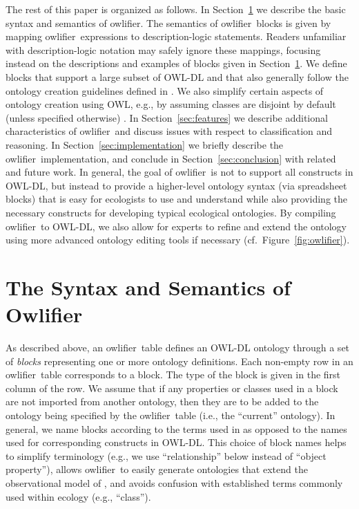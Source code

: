 \documentclass[5p,authoryear]{elsarticle}
\newcommand{\Owlifier}{\textsf{Owlifier}}
\newcommand{\owlifier}{\textsf{owlifier}}
\newcommand{\secref}[1]{Section~\ref{#1}}
\newcommand{\figref}[1]{Figure~\ref{#1}}
\begin{document}
The rest of this paper is organized as follows. In
\secref{sec:owlifier} we describe the basic syntax and semantics of
\owlifier. The semantics of \owlifier\ blocks is given by mapping
\owlifier\ expressions to description-logic statements. Readers
unfamiliar with description-logic notation may safely ignore these
mappings, focusing instead on the descriptions and examples of blocks
given in \secref{sec:owlifier}.  We define blocks that support a large
subset of OWL-DL and that also generally follow the ontology creation
guidelines defined in \citep{rector04:_owl_pizzas}. We also simplify
certain aspects of ontology creation using OWL, e.g., by assuming
classes are disjoint by default (unless specified otherwise)
\citep{rector04:_owl_pizzas}. In \secref{sec:features} we describe
additional characteristics of \owlifier\ and discuss issues with
respect to classification and reasoning. In
\secref{sec:implementation} we briefly describe the
\owlifier\ implementation, and conclude in \secref{sec:conclusion}
with related and future work. In general, the goal of \owlifier\ is
not to support all constructs in OWL-DL, but instead to provide a
higher-level ontology syntax (via spreadsheet blocks) that is easy for
ecologists to use and understand while also providing the necessary
constructs for developing typical ecological ontologies. By compiling
\owlifier\ to OWL-DL, we also allow for experts to refine and extend
the ontology using more advanced ontology editing tools if necessary
(cf.~\figref{fig:owlifier}).



\section{The Syntax and Semantics of \Owlifier}
\label{sec:owlifier}

As described above, an \owlifier\ table defines an OWL-DL \citep{smith04:_owl_web_ontol_languag_guide} ontology through a set of \emph{blocks} representing one or more ontology definitions.  Each non-empty row in an \owlifier\ table corresponds to a block. The type of the block is given in the first column of the row.
We assume that if any properties or classes used in a block are not imported from another ontology, then they are to be added to the ontology being specified by the \owlifier\ table (i.e., the ``current'' ontology). In general, we name blocks according to the terms used in \citep{bowers08:_concep_model_framew_for_expres,madin07:_ontol_for_descr_and_synth} as opposed to the names used for corresponding constructs in OWL-DL. This choice of block names helps to simplify terminology (e.g., we use ``relationship'' below instead of ``object property''), allows \owlifier\ to easily generate ontologies that extend the observational model of \citep{bowers08:_concep_model_framew_for_expres,madin07:_ontol_for_descr_and_synth}, and avoids confusion with established terms commonly used within ecology (e.g., ``class'').
\end{document}
